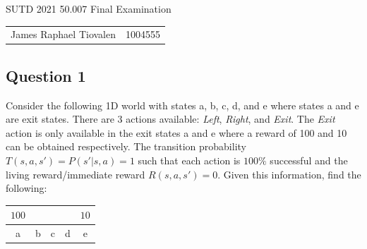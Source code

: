\documentclass[11pt,fancychapters]{article}
\begin{document}
\centerline{\huge{SUTD 2021 50.007 Final Examination}}

\begin{table}[ht]
\centering
\footnotesize
 \begin{tabular}{c c} 
James Raphael Tiovalen & 1004555
 \end{tabular}
\end{table}

\subsection*{Question 1 {\normalfont{[9 points]}}}

Consider the following 1D world with states a, b, c, d, and e where states a and e are exit states. There are 3 actions available: \textit{Left}, \textit{Right}, and \textit{Exit}. The \textit{Exit} action is only available in the exit states a and e where a reward of 100 and 10 can be obtained respectively. The transition probability $T(s, a, s') = P(s' | s, a) = 1$ such that each action is $100\%$ successful and the living reward/immediate reward $R(s, a, s') = 0$. Given this information, find the following:

\begin{table}[h!]
	\centering
	\begin{tabular}{| c | c | c | c | c |} 
		\hline
		$100$ & & & & $10$ \\
		\hline
		a & b & c & d & e \\
		\hline
	\end{tabular}
\end{table}
\end{document}
